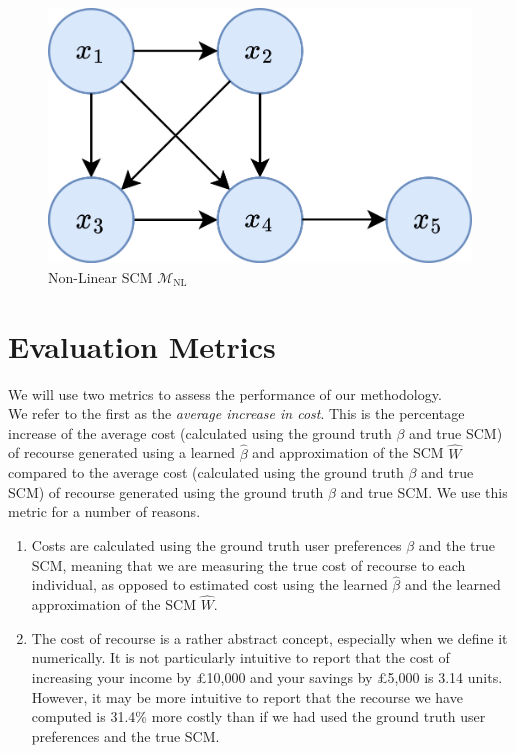 \begin{figure}[!htb]
	\centering
	\includegraphics[width=0.5\linewidth]{images/draw.io/non_linear_scm.png}
	\caption{Non-Linear SCM $\mathcal{M}_{\text{NL}}$}
	\label{fig:non_linear_scm}
\end{figure}


\section{Evaluation Metrics} 

We will use two metrics to assess the performance of our methodology.\\

We refer to the first as the \textit{average increase in cost}. This is the percentage increase of the average cost (calculated using the ground truth $\beta$ and true SCM) of recourse generated using a learned $\hat{\beta}$ and approximation of the SCM $\hat{W}$ compared to the average cost (calculated using the ground truth $\beta$ and true SCM) of recourse generated using the ground truth $\beta$ and true SCM. We use this metric for a number of reasons.\\

\begin{enumerate}
	\item Costs are calculated using the ground truth user preferences $\beta$ and the true SCM, meaning that we are measuring the true cost of recourse to each individual, as opposed to estimated cost using the learned $\hat{\beta}$ and the learned approximation of the SCM $\hat{W}$.
	
	\item The cost of recourse is a rather abstract concept, especially when we define it numerically. It is not particularly intuitive to report that the cost of increasing your income by £10,000 and your savings by £5,000 is 3.14 units. However, it may be more intuitive to report that the recourse we have computed is 31.4\% more costly than if we had used the ground truth user preferences and the true SCM.
\end{enumerate}

